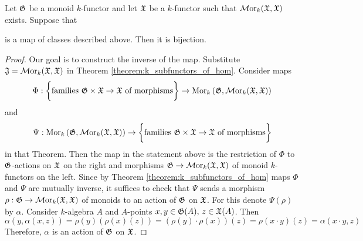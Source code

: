 \begin{theorem}\label{theorem:actions_and_monoid_morphisms}
Let ${\mathfrak G}$ be a monoid $k$-functor and let ${\mathfrak X}$ be a $k$-functor such that $\mathcal{M}\mathrm{or}_{k}({\mathfrak X},{\mathfrak X})$ exists. Suppose that
\begin{center}
\end{center}
is a map of classes described above. Then it is bijection.
\end{theorem}
\begin{proof}
Our goal is to construct the inverse of the map. Substitute ${\mathfrak J} = \mathcal{M}\mathrm{or}_k({\mathfrak X},{\mathfrak X})$ in Theorem \ref{theorem:k_subfunctors_of_hom}. Consider maps
$$\Phi:\bigg\{\mbox{families }{\mathfrak G}\times {\mathfrak X}\rightarrow {\mathfrak X}\mbox{ of morphisms}\bigg\} \rightarrow  \mathrm{Mor}_{k}\left({\mathfrak G},\mathcal{M}\mathrm{or}_k({\mathfrak X},{\mathfrak X})\right)$$
and
$$\Psi:\mathrm{Mor}_{k}\left({\mathfrak G}, \mathcal{M}\mathrm{or}_k({\mathfrak X},{\mathfrak X})\right) \rightarrow \bigg\{\mbox{families }{\mathfrak G}\times {\mathfrak X}\rightarrow {\mathfrak X}\mbox{ of morphisms}\bigg\}$$
in that Theorem. Then the map in the statement above is the restriction of $\Phi$ to ${\mathfrak G}$-actions on ${\mathfrak X}$ on the right and morphisms ${\mathfrak G}\rightarrow \mathcal{M}\mathrm{or}_k({\mathfrak X},{\mathfrak X})$ of monoid $k$-functors on the left. Since by Theorem \ref{theorem:k_subfunctors_of_hom} maps $\Phi$ and $\Psi$ are mutually inverse, it suffices to check that $\Psi$ sends a morphism $\rho:{\mathfrak G}\rightarrow \mathcal{M}\mathrm{or}_{k}({\mathfrak X},{\mathfrak X})$ of monoids to an action of ${\mathfrak G}$ on ${\mathfrak X}$. For this denote $\Psi(\rho)$ by $\alpha$. Consider $k$-algebra $A$ and $A$-points $x,y\in {\mathfrak G}(A),\,z\in {\mathfrak X}(A)$. Then
$$\alpha\left(y, \alpha(x, z)\right) = \rho(y)\left(\rho(x)(z)\right) = \left(\rho(y)\cdot \rho(x)\right)(z) = \rho\left(x\cdot y\right)(z) = \alpha\left(x\cdot y, z\right)$$
Therefore, $\alpha$ is an action of ${\mathfrak G}$ on ${\mathfrak X}$.
\end{proof}

